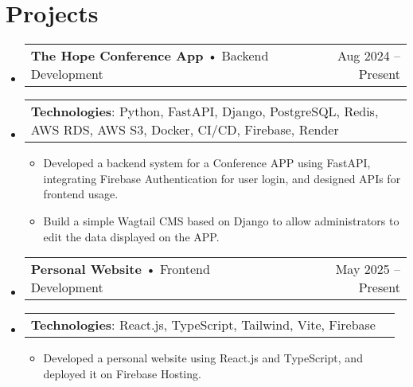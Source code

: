\documentclass[letterpaper,11pt]{article}
\makeatletter
\newcommand{\resumeItemNH}[1]{
  \item\small{
    {#1 \vspace{0pt}}
  }
}
\newcommand{\resumeProjectHeading}[3]{
  \item
    \begin{tabular*}{\textwidth}{l@{\extracolsep{\fill}}r}
      \textbf{#1} \small• #2 & #3 \\
    \end{tabular*}\vspace{0pt}
}
\newcommand{\resumeProjectTechnologiesItem}[1]{
  \vspace{-16pt}\item
  \begin{tabular*}{\textwidth}{l@{\extracolsep{\fill}}r}
    \textbf{\small Technologies}: \small#1 \\
  \end{tabular*}\vspace{-4pt}
}
\newcommand{\resumeSubHeadingListStart}{\begin{itemize}[leftmargin=0pt,label={}]}
\newcommand{\resumeSubHeadingListEnd}{\end{itemize}}
\newcommand{\resumeItemListStart}{\begin{itemize}[leftmargin=*]}
\newcommand{\resumeItemListEnd}{\end{itemize}}
\makeatother
\begin{document}
\section*{Projects}
  \resumeSubHeadingListStart
    \resumeProjectHeading{The Hope Conference App}{Backend Development}{Aug 2024 -- Present}
      \resumeProjectTechnologiesItem{Python, FastAPI, Django, PostgreSQL, Redis, AWS RDS, AWS S3, Docker, CI/CD, Firebase, Render}
      \resumeItemListStart
        \resumeItemNH{Developed a backend system for a Conference APP using FastAPI, integrating Firebase Authentication for user login, and designed APIs for frontend usage.}
        \resumeItemNH{Build a simple Wagtail CMS based on Django to allow administrators to edit the data displayed on the APP.}
      \resumeItemListEnd
    \resumeProjectHeading{Personal Website}{Frontend Development}{May 2025 -- Present}
      \resumeProjectTechnologiesItem{React.js, TypeScript, Tailwind, Vite, Firebase}
      \resumeItemListStart
        \resumeItemNH{Developed a personal website using React.js and TypeScript, and deployed it on Firebase Hosting.}
      \resumeItemListEnd
  \resumeSubHeadingListEnd
\end{document}
